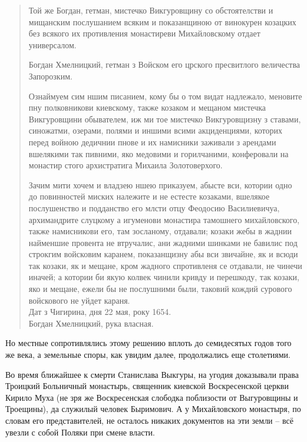 \begin{quotation}
Той же Богдан, гетман, мистечко Викгуровщину со обстоятелстви и мищанским послушанием всяким и показанщиною от винокурен козацких без всякого их противления монастиреви Михайловскому отдает универсалом.

Богдан Хмелницкий, гетман з Войском его црского пресвитлого величества Запорозким.

Ознаймуем сим ншим писанием, кому бы о том видат надлежало, меновите пну полковникови киевскому, также козаком и мещаном мистечка Викгуровщини обывателем, иж ми тое мистечко Викгуровщизну з ставами, синожатми, озерами, полями и иншими всими акциденциями, которих перед войною дедичнии пнове и их намисники заживали з арендами вшелякими так пивними, яко медовими и горилчаними, конферовали на монастир стого архистратига Михаила Золотоверхого.

Зачим мити хочем и владзею ншею приказуем, абысте вси, котории одно до повинностей миских належите и не естесте козаками, вшелякое послушенство и подданство его млсти отцу Феодосию Василиевичуа, архимандрите слуцкому а игуменови монастира тамошнего михайловского, также намисникови его, там зосланому, отдавали; козаки жебы в жаднии найменшие провента не втручалис, ани жадними шинками не бавилис под строкгим войсковим каранем, показанщизну абы вси звичайне, як и всюди так козаки, як и мещане, кром жадного спротивленя се отдавали, не чинечи иначей; а котории би якую колвек чинили кривду и
перешкоду, так козаки, яко и мещане, ежели бы не послушними были, таковий кождий сурового войскового не уйдет караня.\\

Дат з Чигирина, дня 22 мая, року 1654.\\
Богдан Хмелницкий, рука власная.
\end{quotation}

Но местные сопротивлялись этому решению вплоть до семидесятых годов того же века, а земельные споры, как увидим далее, продолжались еще столетиями.

Во время ближайшее к смерти Станислава Выкгуры, на угодия доказывали права Троицкий Больничный монастырь, священник киевской Воскресенской церкви Кирило Муха (не зря же Воскресенская слободка поблизости от Выгуровщины и Троещины), да служилый человек Быримович. А у Михайловского монастыря, по словам его представителей, не осталось никаких документов на эти земли – всё увезли с собой Поляки при смене власти.


